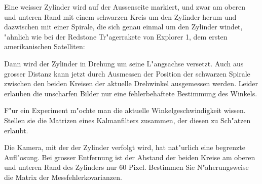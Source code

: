 Eine weisser Zylinder wird auf der Aussenseite markiert, und zwar
am oberen und unteren Rand mit einem schwarzen Kreis um den Zylinder
herum und dazwischen mit einer Spirale, die sich genau einmal
um den Zylinder windet, "ahnlich wie bei der Redstone Tr"agerrakete von
Explorer 1, dem ersten amerikanischen Satelliten:
\begin{center}
\end{center}
Dann wird der Zylinder in Drehung um seine L"angsachse versetzt.
Auch aus grosser Distanz kann jetzt durch Ausmessen der Position
der schwarzen Spirale zwischen den beiden Kreisen der aktuelle Drehwinkel
ausgemessen werden. Leider erlauben die unscharfen Bilder nur
eine fehlerbehaftete Bestimmung des Winkels.
\begin{teilaufgaben}
\item
F"ur ein Experiment
m"ochte man die aktuelle Winkelgeschwindigkeit wissen.
Stellen sie die Matrizen eines Kalmanfilters zusammen, der
diesen zu Sch"atzen erlaubt.
\item
Die Kamera, mit der der Zylinder verfolgt wird, hat nat"urlich eine
begrenzte Aufl"osung. Bei grosser Entfernung ist der Abstand der
beiden Kreise am oberen und unteren Rand des Zylinders nur 60 Pixel.
Bestimmen Sie N"aherungsweise die Matrix der Messfehlerkovarianzen.
\end{teilaufgaben}

